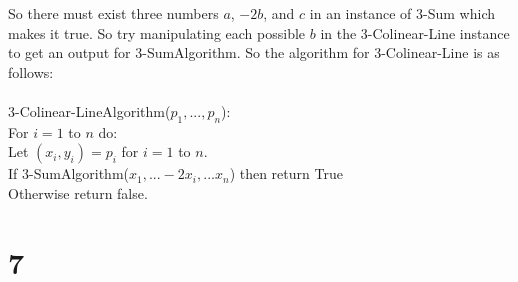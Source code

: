 \documentclass[letterpaper,notitlepage,twoside]{article}
\newcommand\tab[1][1cm]{\hspace*{#1}} %
\begin{document}
So there must exist three numbers $a$, $-2b$, and $c$ in an instance of 3-Sum which makes it true. So try manipulating each possible $b$ in the 3-Colinear-Line instance to get an output for 3-SumAlgorithm. So the algorithm for 3-Colinear-Line is as follows:
\\\\
3-Colinear-LineAlgorithm($p_1,...,p_n$):\\
\tab For $i = 1$ to $n$ do:\\
\tab\tab Let $(x_i, y_i) = p_i$ for $i = 1$ to $n$.\\
\tab\tab If 3-SumAlgorithm($x_1,...-2x_i,...x_n$) then return True\\
\tab Otherwise return false.

\section*{7}
\end{document}
